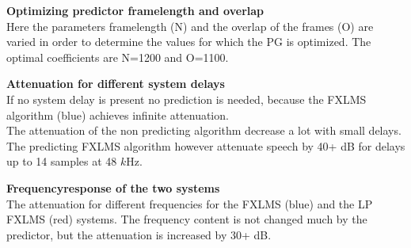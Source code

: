 \large

\begin{minipage}{.45\columnwidth}
	 	\textbf{Optimizing predictor framelength and overlap}\\
		Here the parameters framelength (N) and the overlap of the frames (O) are varied in order to determine the values for which the PG is optimized. The optimal coefficients are N=1200 and O=1100.
	\label{fig:HammingNOP10}
\end{minipage}%
\hspace{4mm}
\begin{minipage}{0.5\columnwidth}
	
\end{minipage}

\vspace{4mm}
\begin{minipage}{.45\columnwidth}
	\textbf{Attenuation for different system delays}\\
	 If no system delay is present no prediction is needed, because the FXLMS algorithm (blue) achieves infinite attenuation.\\ 
	 The attenuation of the non predicting algorithm decrease a lot with small delays. The predicting FXLMS algorithm however attenuate speech by 40+ dB for delays up to 14 samples at 48 $k$Hz.
\end{minipage}%
\hspace{4mm}
\begin{minipage}{0.5\columnwidth}
	
\end{minipage}
\vspace{4mm}

\begin{minipage}{.45\columnwidth}
	\textbf{Frequencyresponse of the two systems}\\
The attenuation for different frequencies for the FXLMS (blue) and the LP FXLMS (red) systems. The frequency content is not changed much by the predictor, but the attenuation is increased by 30+ dB. 
\end{minipage}%
\hspace{4mm}
\begin{minipage}{0.5\columnwidth}
	
\end{minipage}


